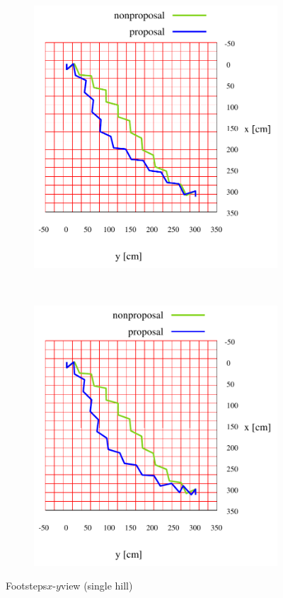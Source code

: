 \documentclass[autodetect-engine,dvipdfmx-if-dvi,ja=standard,a4j,jbase=11pt,magstyle=nomag*]{bxjsreport}
\begin{document}
\begin{figure}[pt]%
    \centering%
    \begin{subfigure}[c]{\linewidth}
        \centering%
        \includegraphics[width=0.55\linewidth, clip]{./figure/sim_hrp2_hill_25_xy.pdf}%
        \label{fig:sim_hrp2_hill_25_xy}%
    \end{subfigure}\\ %
    \vfil%
    \begin{subfigure}[c]{\linewidth}
        \centering%
        \includegraphics[width=0.55\linewidth, clip]{./figure/sim_hrp2_hill_100_xy.pdf}%
        \label{fig:sim_hrp2_hill_100_xy}%
    \end{subfigure}%
    \caption{Footsteps$x$-$y$view (single hill)}%
    \label{fig:sim_hrp2_hill_xy}%
\end{figure}
\end{document}
